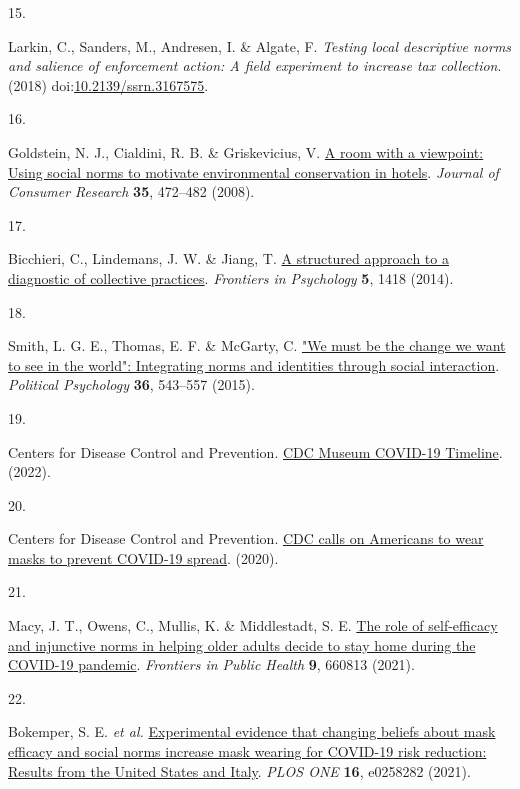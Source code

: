 \documentclass[
  man, donotrepeattitle,floatsintext]{apa6}
\newlength{\cslhangindent}
\newlength{\csllabelwidth}
\newlength{\cslentryspacingunit} %
\newenvironment{CSLReferences}[2] %
 {%
  \setlength{\parindent}{0pt}
  \ifodd #1
  \let\oldpar\par
  \def\par{\hangindent=\cslhangindent\oldpar}
  \fi
  \setlength{\parskip}{#2\cslentryspacingunit}
 }%
 {}
\newcommand{\CSLLeftMargin}[1]{\parbox[t]{\csllabelwidth}{#1}}
\newcommand{\CSLRightInline}[1]{\parbox[t]{\linewidth - \csllabelwidth}{#1}\break}
\begin{document}
\begin{CSLReferences}{0}{0}
\leavevmode{}%
\CSLLeftMargin{15. }%
\CSLRightInline{Larkin, C., Sanders, M., Andresen, I. \& Algate, F. \emph{Testing local descriptive norms and salience of enforcement action: A field experiment to increase tax collection}. (2018) doi:\href{https://doi.org/10.2139/ssrn.3167575}{10.2139/ssrn.3167575}.}

\leavevmode{}%
\CSLLeftMargin{16. }%
\CSLRightInline{Goldstein, N. J., Cialdini, R. B. \& Griskevicius, V. \href{https://doi.org/10.1086/586910}{A room with a viewpoint: Using social norms to motivate environmental conservation in hotels}. \emph{Journal of Consumer Research} \textbf{35}, 472--482 (2008).}

\leavevmode{}%
\CSLLeftMargin{17. }%
\CSLRightInline{Bicchieri, C., Lindemans, J. W. \& Jiang, T. \href{https://doi.org/10.3389/fpsyg.2014.01418}{A structured approach to a diagnostic of collective practices}. \emph{Frontiers in Psychology} \textbf{5}, 1418 (2014).}

\leavevmode{}%
\CSLLeftMargin{18. }%
\CSLRightInline{Smith, L. G. E., Thomas, E. F. \& McGarty, C. \href{https://doi.org/10.1111/pops.12180}{"We must be the change we want to see in the world": Integrating norms and identities through social interaction}. \emph{Political Psychology} \textbf{36}, 543--557 (2015).}

\leavevmode{}%
\CSLLeftMargin{19. }%
\CSLRightInline{Centers for Disease Control and Prevention. \href{https://www.cdc.gov/museum/timeline/covid19.html}{{CDC Museum COVID-19 Timeline}}. (2022).}

\leavevmode{}%
\CSLLeftMargin{20. }%
\CSLRightInline{Centers for Disease Control and Prevention. \href{https://www.cdc.gov/media/releases/2020/p0714-americans-to-wear-masks.html}{{CDC calls on Americans to wear masks to prevent COVID-19 spread}}. (2020).}

\leavevmode{}%
\CSLLeftMargin{21. }%
\CSLRightInline{Macy, J. T., Owens, C., Mullis, K. \& Middlestadt, S. E. \href{https://doi.org/10.3389/fpubh.2021.660813}{The role of self-efficacy and injunctive norms in helping older adults decide to stay home during the {COVID-19} pandemic}. \emph{Frontiers in Public Health} \textbf{9}, 660813 (2021).}

\leavevmode{}%
\CSLLeftMargin{22. }%
\CSLRightInline{Bokemper, S. E. \emph{et al.} \href{https://doi.org/10.1371/journal.pone.0258282}{Experimental evidence that changing beliefs about mask efficacy and social norms increase mask wearing for {COVID-19} risk reduction: Results from the {United States} and {Italy}}. \emph{PLOS ONE} \textbf{16}, e0258282 (2021).}


\end{CSLReferences}
\end{document}
